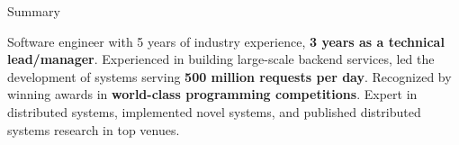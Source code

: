 \documentclass[
	10pt, %
]{resume} %
\begin{document}

\begin{rSection}{Summary}

  Software engineer with 5 years of industry experience, \textbf{3 years as a technical
  lead/manager}. Experienced in building large-scale backend services,
  led the development of systems serving \textbf{500 million requests per day}. Recognized by winning
  awards in \textbf{world-class programming competitions}. Expert in distributed systems,
  implemented novel systems, and published distributed systems research in top
  venues.

\end{rSection}

\end{document}
